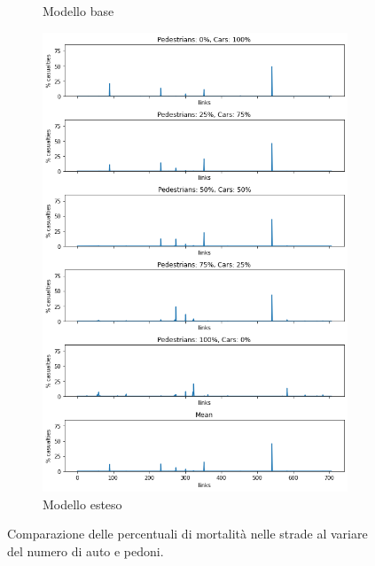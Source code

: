 \begin{figure}[ht]
\begin{subfigure}{0.475\textwidth}
        \caption{Modello base}
        \label{fig:base-link-casualties}
    \end{subfigure}
    \hfill
    \begin{subfigure}{0.475\textwidth}
        \centering
        \includegraphics[width=\textwidth]{images/analisi/new_links_casualties}
        \caption{Modello esteso}
        \label{fig:new-link-casualties}
    \end{subfigure}
    \caption{Comparazione delle percentuali di mortalità nelle strade al variare del numero di auto e pedoni.}
    \label{fig:analisi-comparison-critical-links1}
\end{figure}

